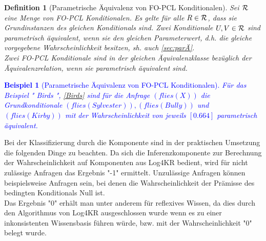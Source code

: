 \documentclass[a4paper, 11pt]{book}
\newtheorem{Def}{Definition }[section]
\newtheorem{Bsp}{Beispiel}[section]
\begin{document}
\begin{Def}[Parametrische Äquivalenz von FO-PCL Konditionalen] \label{Äquivalenz in FO-PCL}  
	Sei $  \cal{R} $ eine Menge von FO-PCL Konditionalen. Es gelte für alle $ R \in \cal{R} $, dass sie Grundinstanzen des gleichen Konditionals sind. Zwei Konditionale $ U,V \in \cal{R} $ sind parametrisch äquivalent, wenn sie den gleichen Parameterwert, d.h. die gleiche vorgegebene Wahrscheinlichkeit besitzen, sh. auch \ref{sec:parÄ}.\\
	Zwei FO-PCL Konditionale sind in der gleichen Äquivalenzklasse bezüglich der Äquivalenzrelation, wenn sie parametrisch äquivalent sind. \label{Äquivalenzklassen} 
\end{Def}

\textcolor{blue}{
\begin{Bsp}[Parametrische Äquivalenz von FO-PCL Konditionalen]\label{Bsp:parametische Äquivalenz}
	Für das Beispiel "{} Birds "{}, \ref{Birds} sind für die Anfrage $ (flies(X)) $ die Grundkonditionale $ (flies(Sylvester)), (flies(Bully)) $ und $ (flies(Kirby)) $ mit der Wahrscheinlichkeit von jeweils $ [0.664] $ parametrisch äquivalent.
\end{Bsp}	
}


Bei der Klassifizierung durch die Komponente sind in der praktischen Umsetzung die folgenden Dinge zu beachten. 
Da sich die Inferenzkomponente zur Berechnung der Wahrscheinlichkeit auf Komponenten aus Log4KR bedient, wird für nicht zulässige Anfragen das Ergebnis "{}-1"{} ermittelt. Unzulässige Anfragen können beispielsweise Anfragen sein, bei denen die Wahrscheinlichkeit der Prämisse des bedingten Konditionals Null ist.\\
Das Ergebnis  "{}0"{} erhält man unter anderem für reflexives Wissen, da dies durch den Algorithmus von Log4KR ausgeschlossen wurde wenn es zu einer inkonsistenten Wissensbasis führen würde, bzw. mit der Wahrscheinlichkeit  "{}0"{} belegt wurde. 
	
	
	
	
\end{document}
